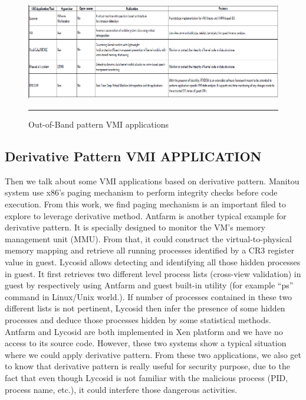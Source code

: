 \begin{figure}[htbp]
	\centering
		\includegraphics{Figures/Figure1.pdf}
		\rule{35em}{0.5pt}
	\caption[Out-of-Band pattern VMI applications]{Out-of-Band pattern VMI applications}
	\label{fig:Out-of-Band pattern VMI applications}
\end{figure}


\subsection{Derivative Pattern VMI APPLICATION}
Then we talk about some VMI applications based on derivative pattern. Manitou system use x86’s paging mechanism to perform integrity checks before code execution. From this work, we find paging mechanism is an important filed to explore to leverage derivative method. Antfarm is another typical example for derivative pattern. It is specially designed to monitor the VM’s memory management unit (MMU). From that, it could construct the virtual-to-physical memory mapping and retrieve all running processes identified by a CR3 register value in guest. Lycosid allows detecting and identifying all those hidden processes in guest. It first retrieves two different level process lists (cross-view validation) in guest by respectively using Antfarm and guest built-in utility (for example “ps” command in Linux/Unix world.). If number of processes contained in these two different lists is not pertinent, Lycosid then infer the presence of some hidden processes and deduce those processes hidden by some statistical methods. Antfarm and Lycosid are both implemented in Xen platform and we have no access to its source code. However, these two systems show a typical situation where we could apply derivative pattern. From these two applications, we also get to know that derivative pattern is really useful for security purpose, due to the fact that even though Lycosid is not familiar with the malicious process (PID, process name, etc.), it could interfere those dangerous activities.

